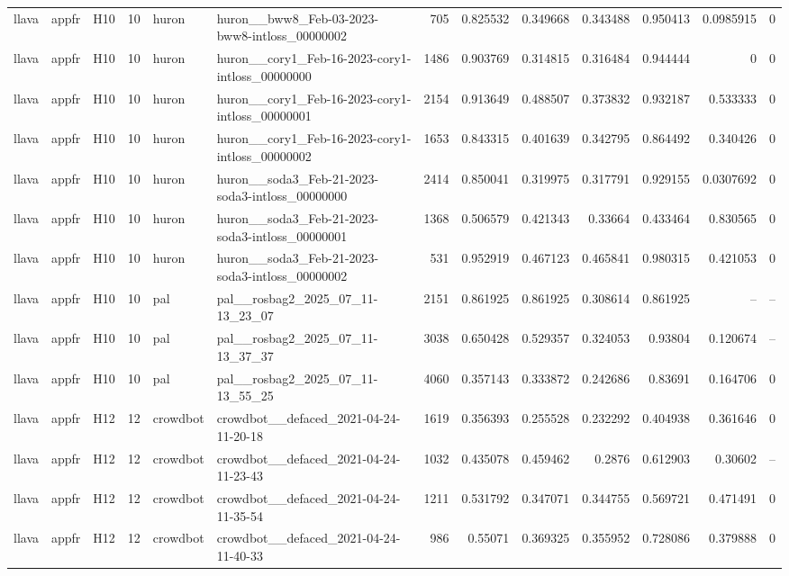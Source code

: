 \begin{longtable}{lllrllrrrrrrr}
llava & appfr & H10 & 10 & huron & huron\_\_bww8\_Feb-03-2023-bww8-intloss\_00000002 & 705 & 0.825532 & 0.349668 & 0.343488 & 0.950413 & 0.0985915 & 0 \\
llava & appfr & H10 & 10 & huron & huron\_\_cory1\_Feb-16-2023-cory1-intloss\_00000000 & 1486 & 0.903769 & 0.314815 & 0.316484 & 0.944444 & 0 & 0 \\
llava & appfr & H10 & 10 & huron & huron\_\_cory1\_Feb-16-2023-cory1-intloss\_00000001 & 2154 & 0.913649 & 0.488507 & 0.373832 & 0.932187 & 0.533333 & 0 \\
llava & appfr & H10 & 10 & huron & huron\_\_cory1\_Feb-16-2023-cory1-intloss\_00000002 & 1653 & 0.843315 & 0.401639 & 0.342795 & 0.864492 & 0.340426 & 0 \\
llava & appfr & H10 & 10 & huron & huron\_\_soda3\_Feb-21-2023-soda3-intloss\_00000000 & 2414 & 0.850041 & 0.319975 & 0.317791 & 0.929155 & 0.0307692 & 0 \\
llava & appfr & H10 & 10 & huron & huron\_\_soda3\_Feb-21-2023-soda3-intloss\_00000001 & 1368 & 0.506579 & 0.421343 & 0.33664 & 0.433464 & 0.830565 & 0 \\
llava & appfr & H10 & 10 & huron & huron\_\_soda3\_Feb-21-2023-soda3-intloss\_00000002 & 531 & 0.952919 & 0.467123 & 0.465841 & 0.980315 & 0.421053 & 0 \\
llava & appfr & H10 & 10 & pal & pal\_\_rosbag2\_2025\_07\_11-13\_23\_07 & 2151 & 0.861925 & 0.861925 & 0.308614 & 0.861925 & -- & -- \\
llava & appfr & H10 & 10 & pal & pal\_\_rosbag2\_2025\_07\_11-13\_37\_37 & 3038 & 0.650428 & 0.529357 & 0.324053 & 0.93804 & 0.120674 & -- \\
llava & appfr & H10 & 10 & pal & pal\_\_rosbag2\_2025\_07\_11-13\_55\_25 & 4060 & 0.357143 & 0.333872 & 0.242686 & 0.83691 & 0.164706 & 0 \\
llava & appfr & H12 & 12 & crowdbot & crowdbot\_\_defaced\_2021-04-24-11-20-18 & 1619 & 0.356393 & 0.255528 & 0.232292 & 0.404938 & 0.361646 & 0 \\
llava & appfr & H12 & 12 & crowdbot & crowdbot\_\_defaced\_2021-04-24-11-23-43 & 1032 & 0.435078 & 0.459462 & 0.2876 & 0.612903 & 0.30602 & -- \\
llava & appfr & H12 & 12 & crowdbot & crowdbot\_\_defaced\_2021-04-24-11-35-54 & 1211 & 0.531792 & 0.347071 & 0.344755 & 0.569721 & 0.471491 & 0 \\
llava & appfr & H12 & 12 & crowdbot & crowdbot\_\_defaced\_2021-04-24-11-40-33 & 986 & 0.55071 & 0.369325 & 0.355952 & 0.728086 & 0.379888 & 0 \\

\end{longtable}
